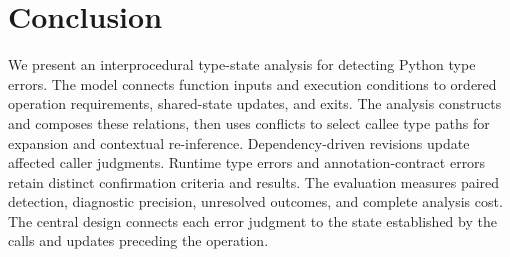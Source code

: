 \section{Conclusion}
\label{sec:conclusion}
We present an interprocedural type-state analysis for detecting Python
type errors. The model connects function inputs and execution conditions
to ordered operation requirements, shared-state updates, and exits.
The analysis constructs and composes these relations, then uses conflicts
to select callee type paths for expansion and contextual re-inference.
Dependency-driven revisions update affected caller judgments. Runtime
type errors and annotation-contract errors retain distinct confirmation
criteria and results. The evaluation measures paired detection, diagnostic
precision, unresolved outcomes, and complete analysis cost. The central
design connects each error judgment to the state established by the calls
and updates preceding the operation.
